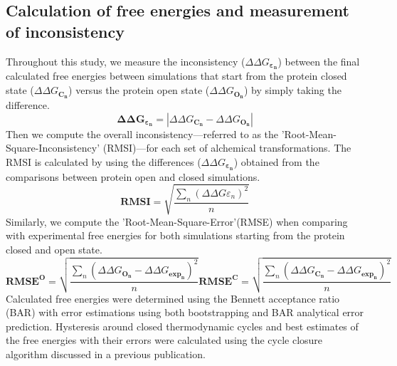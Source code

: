 \subsection{Calculation of free energies and measurement of inconsistency}
Throughout this study, we measure the inconsistency ($\Delta\Delta G_{\boldsymbol{\varepsilon_n}}$) between the final calculated free energies between simulations that start from the protein closed state ($\Delta\Delta G_{\mathbf{C_n}}$) versus the protein open state ($\Delta\Delta G_{\mathbf{O_n}}$) by simply taking the difference.
\begin{equation}
  \mathbf{\Delta\Delta G_{\boldsymbol{\varepsilon_n}}}  = \left |  \Delta\Delta G_{\mathbf{C_n}  } - \Delta\Delta G_{\mathbf{O_n} }\right |
  \label{eqn:diffG}
\end{equation}
Then we compute the overall inconsistency---referred to as the 'Root-Mean-Square-Inconsistency' (RMSI)---for each set of alchemical transformations.
The RMSI is calculated by using the differences ($\Delta\Delta G_{\boldsymbol{\varepsilon_n}}$) obtained from the comparisons between protein open and closed simulations.
\begin{equation}
\mathbf{RMSI} = \sqrt{   \frac{ \sum_{n} (\Delta\Delta G\varepsilon_{n} )^2  } {n}}
  \label{eqn:RMSI}
\end{equation}
Similarly, we compute the 'Root-Mean-Square-Error'(RMSE) when comparing with experimental free energies for both simulations starting from the protein closed and open state.
\begin{equation}
\mathbf{RMSE^{O}} = \sqrt{   \frac{ \sum_{n} (\Delta\Delta G_{\mathbf{O_n}} - \Delta\Delta G_{\mathbf{exp_n}} )^2  } {n}}
\mathbf{RMSE^{C}} = \sqrt{   \frac{ \sum_{n} (\Delta\Delta G_{\mathbf{C_n}} - \Delta\Delta G_{\mathbf{exp_n}} )^2  } {n}}
  \label{eqn:RMSE}
\end{equation}
Calculated free energies were determined using the Bennett acceptance ratio\cite{BAR} (BAR) with error estimations using both bootstrapping and BAR analytical error prediction\cite{BARerror}.
Hysteresis around closed thermodynamic cycles and best estimates of the free energies with their errors were calculated using the cycle closure algorithm discussed in a previous publication\cite{FEP/REST}.

